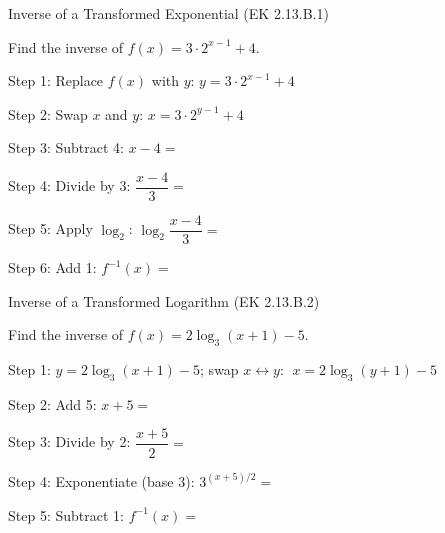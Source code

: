 \documentclass[10pt]{article}
\begin{document}
\vspace{0.06in}

\begin{notesbox}{Inverse of a Transformed Exponential (EK 2.13.B.1)}

Find the inverse of $f(x) = 3 \cdot 2^{x-1} + 4$.

\vspace{4pt}
Step 1: Replace $f(x)$ with $y$: \quad $y = 3 \cdot 2^{x-1} + 4$

\vspace{4pt}
Step 2: Swap $x$ and $y$: \quad $x = 3 \cdot 2^{y-1} + 4$

\vspace{4pt}
Step 3: Subtract 4: \quad $x - 4 = $ 

\vspace{4pt}
Step 4: Divide by 3: \quad $\dfrac{x-4}{3} = $ 

\vspace{4pt}
Step 5: Apply $\log_2$: \quad $\log_2\!\dfrac{x-4}{3} = $ 

\vspace{4pt}
Step 6: Add 1: \quad $f^{-1}(x) = $ 

\end{notesbox}

\vspace{0.06in}

\begin{notesbox}{Inverse of a Transformed Logarithm (EK 2.13.B.2)}

Find the inverse of $f(x) = 2\log_3(x+1) - 5$.

\vspace{4pt}
Step 1: $y = 2\log_3(x+1) - 5$; swap $x \leftrightarrow y$: $\;x = 2\log_3(y+1) - 5$

\vspace{4pt}
Step 2: Add 5: \quad $x + 5 = $ 

\vspace{4pt}
Step 3: Divide by 2: \quad $\dfrac{x+5}{2} = $ 

\vspace{4pt}
Step 4: Exponentiate (base 3): \quad $3^{(x+5)/2} = $ 

\vspace{4pt}
Step 5: Subtract 1: \quad $f^{-1}(x) = $ 

\end{notesbox}
\end{document}
